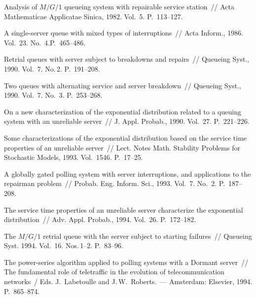 \begin{multicols}{2}
{{\begin{thebibliography}{99}
Analysis of $M/G/1$ queueing system with repairable service station~//
Acta Mathematicae Applicatae Sinica, 1982. Vol.~5. P.~113--127.

A single-server queue with mixed types of interruptions~//
Acta Inform., 1986. Vol.~23. No.~4.\linebreak P.~465--486.

Retrial queues with server subject to breakdowns and repairs~//
Queueing Syst., 1990. Vol.~7. No.\,2. P.~191--208.

Two queues with alternating service and server breakdown~// Queueing
Syst., 1990. Vol.~7. No.~3. P.~253--268.

On a new characterization of the exponential distribution related to a queuing system with an unreliable server~//
J. Appl. Probab., 1990. Vol.~27. P.~221--226.

Some characterizations of the exponential distribution based on the service
time properties of an unreliable server~//
Lect. Notes Math. Stability Problems for Stochastic Models, 1993. Vol.~1546. P.~17--25.

A globally gated polling system with server
interruptions, and applications to the repairman problem~//
 Probab. Eng. Inform. Sci., 1993. Vol.~7. No.~2. P.~187--208.

The service time properties of an unreliable server characterize the exponential distribution~//
Adv. Appl. Probab., 1994. Vol.~26. P.~172--182.

The $M/G/1$ retrial queue with the server subject to starting failures~//
Queueing Syst. 1994. Vol.~16. Nos.\,1--2. P.~83--96.

The power-series algorithm applied to polling systems with a Dormant server~//
The fundamental role of teletraffic in the evolution of telecommunication networks~/
Eds. J.~Labetoulle and J.\,W.~Roberts.~--- Amsterdam: Elsevier, 1994. P.~865--874.


\end{thebibliography}}}
\end{multicols}

